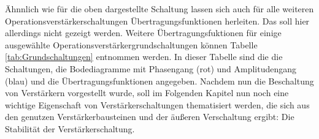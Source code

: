 \begin{frame}
{%
        \par
        Ähnnlich wie für die oben dargestellte Schaltung lassen sich auch für alle weiteren Operationsverstärkerschaltungen Übertragungsfunktionen herleiten. Das soll hier allerdings nicht gezeigt werden.
        Weitere Übertragungsfuktionen für einige ausgewählte Operationsverstärkergrundschaltungen können Tabelle \ref{tab:Grundschaltungen} entnommen werden. 
        In dieser Tabelle sind die die Schaltungen, die Bodediagramme mit Phasengang (rot) und Amplitudengang (blau) und die Übertragungsfunktionen angegeben. 
        Nachdem nun die Beschaltung von Verstärkern vorgestellt wurde, soll im Folgenden Kapitel nun noch eine wichtige Eigenschaft von Verstärkerschaltungen thematisiert werden, die sich aus den genutzen Verstärkerbausteinen und der äußeren Verschaltung ergibt: Die Stabilität der Verstärkerschaltung.
        
}
\end{frame}
